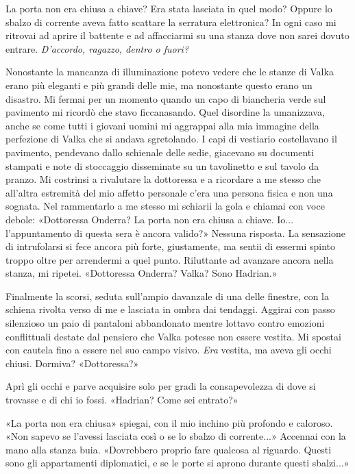 La porta non era chiusa a chiave? Era stata lasciata in quel modo?
Oppure lo sbalzo di corrente aveva fatto scattare la serratura
elettronica? In ogni caso mi ritrovai ad aprire il battente e ad
affacciarmi su una stanza dove non sarei dovuto entrare.
\emph{D'accordo, ragazzo, dentro o fuori?}

Nonostante la mancanza di illuminazione potevo vedere che le stanze di
Valka erano più eleganti e più grandi delle mie, ma nonostante questo
erano un disastro. Mi fermai per un momento quando un capo di biancheria
verde sul pavimento mi ricordò che stavo ficcanasando. Quel disordine la
umanizzava, anche se come tutti i giovani uomini mi aggrappai alla mia
immagine della perfezione di Valka che si andava sgretolando. I capi di
vestiario costellavano il pavimento, pendevano dallo schienale delle
sedie, giacevano su documenti stampati e note di stoccaggio disseminate
su un tavolinetto e sul tavolo da pranzo. Mi costrinsi a rivalutare la
dottoressa e a ricordare a me stesso che all'altra estremità del mio
affetto personale c'era una persona fisica e non una sognata. Nel
rammentarlo a me stesso mi schiarii la gola e chiamai con voce debole:
«Dottoressa Onderra? La porta non era chiusa a chiave. Io...
l'appuntamento di questa sera è ancora valido?» Nessuna risposta. La
sensazione di intrufolarsi si fece ancora più forte, {giustamente}, ma
sentii di essermi spinto troppo oltre per arrendermi a quel punto.
Riluttante ad avanzare ancora nella stanza, mi ripetei. «Dottoressa
Onderra? Valka? Sono Hadrian.»

Finalmente la scorsi, seduta sull'ampio davanzale di una delle finestre,
con la schiena rivolta verso di me e lasciata in ombra dai tendaggi.
Aggirai con passo silenzioso un paio di pantaloni abbandonato mentre
lottavo contro emozioni conflittuali destate dal pensiero che Valka
potesse non essere vestita. Mi spostai con cautela fino a essere nel suo
campo visivo. \emph{Era} vestita, ma aveva gli occhi chiusi. Dormiva?
«Dottoressa?»

Aprì gli occhi e parve acquisire solo per gradi la consapevolezza di
dove si trovasse e di chi io fossi. «Hadrian? Come sei entrato?»

«La porta non era chiusa» spiegai, con il mio inchino più profondo e
caloroso. «Non sapevo se l'avessi lasciata così o se lo sbalzo di
corrente...» Accennai con la mano alla stanza buia. «Dovrebbero proprio
fare qualcosa al riguardo. Questi sono gli appartamenti diplomatici, e
se le porte si aprono durante questi sbalzi...»

